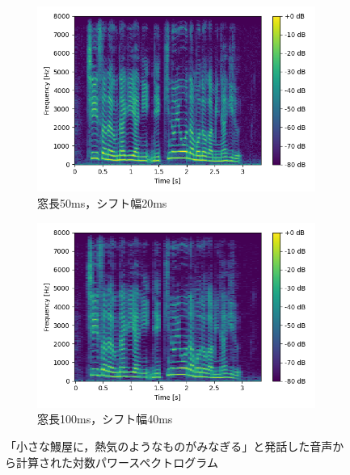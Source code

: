 \documentclass[12pt]{jarticle}
\numberwithin{equation}{section}    %
\numberwithin{figure}{section}      %
\numberwithin{table}{section}      %
\begin{document}
\begin{figure}[tb]
    \begin{subfigure}[b]{0.48\textwidth}
        \centering
        \includegraphics[width=\textwidth]{./figure/sec2/spectrogram_4.png}
        \caption{窓長50ms，シフト幅20ms}
        \label{sec2:fig:spectrogram3}
    \end{subfigure}
    \begin{subfigure}[b]{0.48\textwidth}
        \centering
        \includegraphics[width=\textwidth]{./figure/sec2/spectrogram_8.png}
        \caption{窓長100ms，シフト幅40ms}
        \label{sec2:fig:spectrogram4}
    \end{subfigure}
    \caption{「小さな鰻屋に，熱気のようなものがみなぎる」と発話した音声から計算された対数パワースペクトログラム}
    \label{sec2:fig:log_power_spectrograms}
\end{figure}
\end{document}
